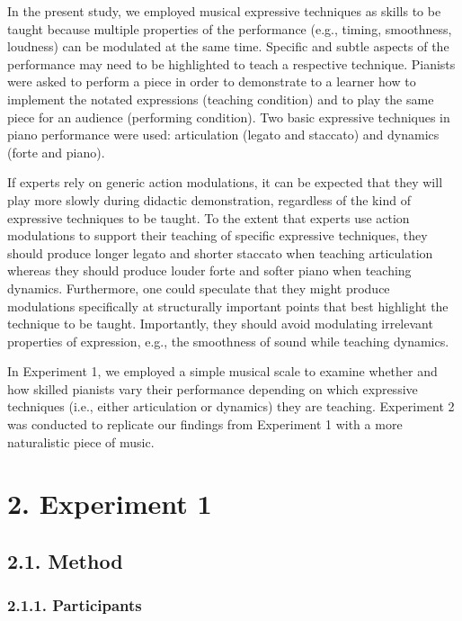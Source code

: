 \documentclass[
  english,
  man,floatsintext]{apa6}
\begin{document}
In the present study, we employed musical expressive techniques as skills to be taught because multiple properties of the performance (e.g., timing, smoothness, loudness) can be modulated at the same time. Specific and subtle aspects of the performance may need to be highlighted to teach a respective technique. Pianists were asked to perform a piece in order to demonstrate to a learner how to implement the notated expressions (teaching condition) and to play the same piece for an audience (performing condition). Two basic expressive techniques in piano performance were used: articulation (legato and staccato) and dynamics (forte and piano).

If experts rely on generic action modulations, it can be expected that they will play more slowly during didactic demonstration, regardless of the kind of expressive techniques to be taught. To the extent that experts use action modulations to support their teaching of specific expressive techniques, they should produce longer legato and shorter staccato when teaching articulation whereas they should produce louder forte and softer piano when teaching dynamics. Furthermore, one could speculate that they might produce modulations specifically at structurally important points that best highlight the technique to be taught. Importantly, they should avoid modulating irrelevant properties of expression, e.g., the smoothness of sound while teaching dynamics.

In Experiment 1, we employed a simple musical scale to examine whether and how skilled pianists vary their performance depending on which expressive techniques (i.e., either articulation or dynamics) they are teaching. Experiment 2 was conducted to replicate our findings from Experiment 1 with a more naturalistic piece of music.

\hypertarget{experiment-1}{%
\section{2. Experiment 1}\label{experiment-1}}

\hypertarget{method}{%
\subsection{2.1. Method}\label{method}}

\hypertarget{participants}{%
\subsubsection{2.1.1. Participants}\label{participants}}
\end{document}
